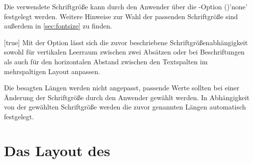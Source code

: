 \begin{Declaration*}{}
\begin{Declaration*}{}
\begin{Declaration*}{}
Die verwendete Schriftgröße kann durch den Anwender über die \KOMAScript-Option 
()'none' festgelegt 
werden.
Weitere Hinweise zur Wahl der passenden Schriftgröße sind außerdem in 
\autoref{sec:fontsize} zu finden.

\begin{Declaration}[v2.05]{}[true]%
\printdeclarationlist%
%
Mit der Option  lässt sich die zuvor beschriebene 
Schriftgrößenabhängigkeit sowohl für vertikalen Leerraum zwischen zwei Absätzen 
oder bei Beschriftungen als auch für den horizontalen Abstand zwischen den 
Textspalten im mehrspaltigen Layout anpassen.
%
\begin{values}{}
  Die besagten Längen werden nicht angepasst, passende Werte sollten bei einer 
  Änderung der Schriftgröße durch den Anwender gewählt werden.
  In Abhängigkeit von der gewählten Schriftgröße werden die zuvor genannten 
  Längen automatisch festgelegt.
\end{values}
\end{Declaration}



\section{Das Layout des \CDs}
%

\end{Declaration*}
\end{Declaration*}
\end{Declaration*}
